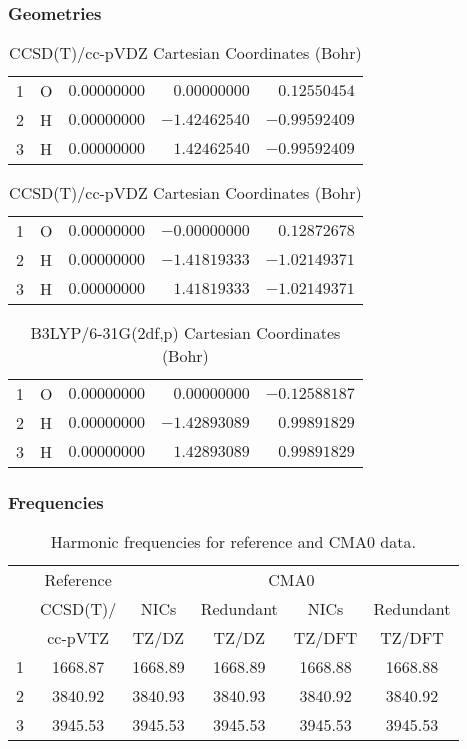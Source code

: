 \documentclass[10pt,oneside]{article}
\begin{document}
\begin{table}[h!]
\subsubsection*{Geometries}
\begin{multicols}{2}
\centering
\caption{CCSD(T)/cc-pVTZ Cartesian Coordinates (Bohr)}
\begin{tabular}{llrrr}
\toprule
1  & O  & $ 0.00000000$ & $ 0.00000000$ & $ 0.12550454$ \\
2  & H  & $ 0.00000000$ & $-1.42462540$ & $-0.99592409$ \\
3  & H  & $ 0.00000000$ & $ 1.42462540$ & $-0.99592409$ \\
\bottomrule
\end{tabular}
\caption{CCSD(T)/cc-pVDZ Cartesian Coordinates (Bohr)}
\begin{tabular}{llrrr}
\toprule
1  & O  & $ 0.00000000$ & $-0.00000000$ & $ 0.12872678$ \\
2  & H  & $ 0.00000000$ & $-1.41819333$ & $-1.02149371$ \\
3  & H  & $ 0.00000000$ & $ 1.41819333$ & $-1.02149371$ \\
\bottomrule
\end{tabular}
\end{multicols}
\end{table}

\begin{table}[h]
\centering
\caption{B3LYP/6-31G(2df,p) Cartesian Coordinates (Bohr)}
\begin{tabular}{llrrr}
\toprule
1  & O  & $ 0.00000000$ & $ 0.00000000$ & $-0.12588187$ \\
2  & H  & $ 0.00000000$ & $-1.42893089$ & $ 0.99891829$ \\
3  & H  & $ 0.00000000$ & $ 1.42893089$ & $ 0.99891829$ \\
\bottomrule
\end{tabular}
\end{table}

\begin{table}[h!]
\subsubsection*{Frequencies}
\centering
\caption{Harmonic frequencies for reference and CMA0 data.}
\begin{tabular}{cccccc}
\toprule
{} & Reference & \multicolumn{4}{c}{CMA0} \\
{} &  CCSD(T)/ &    NICs &  Redundant &    NICs & Redundant \\
{} &   cc-pVTZ &   TZ/DZ &      TZ/DZ &  TZ/DFT &    TZ/DFT \\
\midrule
1 &   1668.87 & 1668.89 &    1668.89 & 1668.88 &   1668.88 \\
2 &   3840.92 & 3840.93 &    3840.93 & 3840.92 &   3840.92 \\
3 &   3945.53 & 3945.53 &    3945.53 & 3945.53 &   3945.53 \\
\bottomrule
\end{tabular}
\end{table}
\end{document}
